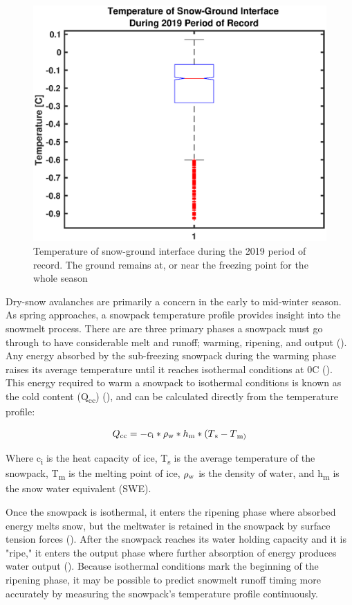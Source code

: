  \begin{figure}[!t]
    \centering
    \includegraphics[width=0.8\linewidth]{figures/TempGrad/GroundTemp.eps}
    \caption{Temperature of snow-ground interface during the 2019 period of record. The ground remains at, or near the freezing point for the whole season}
    \label{fig:GroundTemp}
 \end{figure}

Dry-snow avalanches are primarily a concern in the early to mid-winter season. As spring approaches, a snowpack temperature profile provides insight into the snowmelt process. There are are three primary phases a snowpack must go through to have considerable melt and runoff; warming, ripening, and output (\cite{dingman2015}). Any energy absorbed by the sub-freezing snowpack during the warming phase raises its average temperature until it reaches isothermal conditions at 0\textdegree C (\cite{dingman2015}). This energy required to warm a snowpack to isothermal conditions is known as the cold content (Q\textsubscript{cc}) (\cite{dingman2015}), and can be calculated directly from the temperature profile:

\begin{equation} \label{eq:1}
Q\textsubscript{cc} = -c\textsubscript{i}*\rho\textsubscript{w}*h\textsubscript{m}*(T\textsubscript{s}-T\textsubscript{m)}
\end{equation}

Where c\textsubscript{i} is the heat capacity of ice, T\textsubscript{s} is the average temperature of the snowpack, T\textsubscript{m} is the melting point of ice, $\rho\textsubscript{w}$ is the density of water, and h\textsubscript{m} is the snow water equivalent (SWE). 

Once the snowpack is isothermal, it enters the ripening phase where absorbed energy melts snow, but the meltwater is retained in the snowpack by surface tension forces (\cite{dingman2015}). After the snowpack reaches its water holding capacity and it is "ripe," it enters the output phase where further absorption of energy produces water output (\cite{dingman2015}). Because isothermal conditions mark the beginning of the ripening phase, it may be possible to predict snowmelt runoff timing more accurately by measuring the snowpack's temperature profile continuously.

